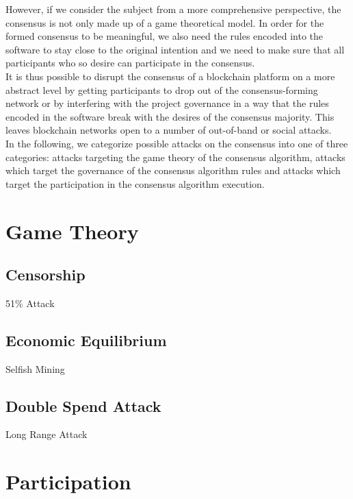 \documentclass[11pt,a4paper,draft]{article}
\begin{document}
However, if we consider the subject from a more comprehensive perspective, the consensus is not only made up of a game theoretical model. In order for the formed consensus to be meaningful, we also need the rules encoded into the software to stay close to the original intention and we need to make sure that all participants who so desire can participate in the consensus.\\

It is thus possible to disrupt the consensus of a blockchain platform on a more abstract level by getting participants to drop out of the consensus-forming network or by interfering with the project governance in a way that the rules encoded in the software break with the desires of the consensus majority. This leaves blockchain networks open to a number of out-of-band or social attacks.\\

In the following, we categorize possible attacks on the consensus into one of three categories: attacks targeting the game theory of the consensus algorithm, attacks which target the governance of the consensus algorithm rules and attacks which target the participation in the consensus algorithm execution.\\

\section{Game Theory}

\subsection{Censorship}

51\% Attack

\subsection{Economic Equilibrium}

Selfish Mining

\subsection{Double Spend Attack}

Long Range Attack

\section{Participation}
\end{document}
